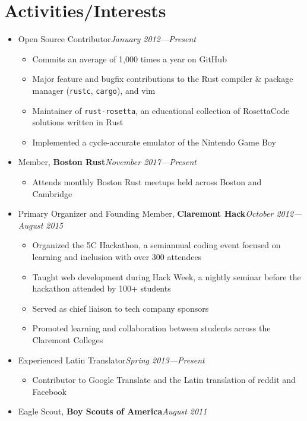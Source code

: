 \documentclass[10pt]{article}
\newcommand\activity[3]{{#1, \textbf{#3}\hfill\textit{#2}}}
\begin{document}
\section*{Activities/Interests}
\begin{itemize}[label=,leftmargin=0pt]
    \item Open Source Contributor\hfill\textit{January 2012---Present}
        \begin{itemize}[topsep=2pt]
            \item Commits an average of 1,000 times a year on GitHub
            \item Major feature and bugfix contributions to the Rust compiler
            \& package manager (\texttt{rustc}, \texttt{cargo}), and vim
            \item Maintainer of \texttt{rust-rosetta}, an educational collection
            of RosettaCode solutions written in Rust
            \item Implemented a cycle-accurate emulator of the Nintendo Game
            Boy
        \end{itemize}
    \item \activity{Member}{November 2017---Present}{Boston Rust}
        \begin{itemize}[topsep=2pt]
            \item Attends monthly Boston Rust meetups held across Boston and
            Cambridge
        \end{itemize}
    \item \activity{Primary Organizer and Founding Member}{October 2012---August 2015}{Claremont Hack}
        \begin{itemize}[topsep=2pt]
        \item Organized the 5C Hackathon, a semiannual coding event focused on
        learning and inclusion with over 300 attendees
            \item Taught web development during Hack Week, a nightly seminar
            before the hackathon attended by 100+ students
            \item Served as chief liaison to tech company sponsors
            \item Promoted learning and collaboration between students across
            the Claremont Colleges
        \end{itemize}
    \item Experienced Latin Translator\hfill\textit{Spring 2013---Present}
        \begin{itemize}[topsep=2pt]
            \item Contributor to Google Translate and the Latin translation of
                reddit and Facebook
        \end{itemize}
    \item \activity{Eagle Scout}{August 2011}{Boy Scouts of America}
\end{itemize}
\end{document}

